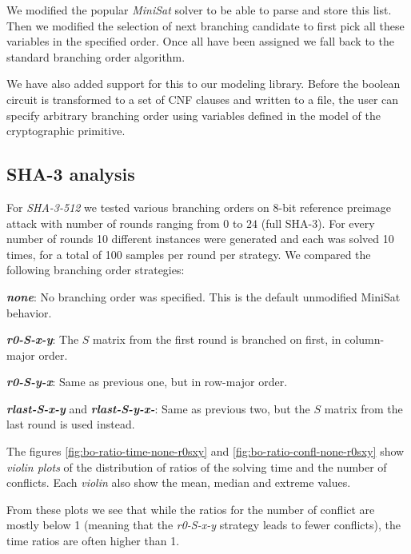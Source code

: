 We modified the popular \emph{MiniSat} solver \cite{een2005minisat} to be able to parse and store this list.
Then we modified the selection of next branching candidate to first pick all these variables in the specified order.
Once all have been assigned we fall back to the standard branching order algorithm.

We have also added support for this to our modeling library.
Before the boolean circuit is transformed to a set of CNF clauses and written to a file, the user can specify arbitrary branching order using variables defined in the model of the cryptographic primitive.

\subsection{SHA-3 analysis}
For \emph{SHA-3-512} we tested various branching orders on $8$-bit reference preimage attack with number of rounds ranging from $0$ to $24$ (full SHA-3).
For every number of rounds 10 different instances were generated and each was solved 10 times, for a total of 100 samples per round per strategy.
We compared the following branching order strategies:

\textbf{\emph{none}}: No branching order was specified. This is the default unmodified MiniSat behavior.

\textbf{\emph{r0-S-x-y}}: The $S$ matrix from the first round is branched on first, in column-major order.

\textbf{\emph{r0-S-y-x}}: Same as previous one, but in row-major order.

\textbf{\emph{rlast-S-x-y}} and \textbf{\emph{rlast-S-y-x-}}: Same as previous two, but the $S$ matrix from the last round is used instead.	

The figures \ref{fig:bo-ratio-time-none-r0sxy} and \ref{fig:bo-ratio-confl-none-r0sxy} show \emph{violin plots} of the distribution of ratios of the solving time and the number of conflicts.
Each \emph{violin} also show the mean, median and extreme values.

From these plots we see that while the ratios for the number of conflict are mostly below 1 (meaning that the \emph{r0-S-x-y} strategy leads to fewer conflicts), the time ratios are often higher than 1.


